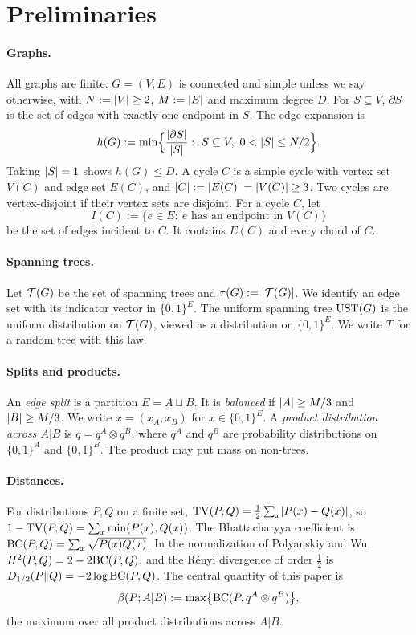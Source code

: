 \section{Preliminaries}\label{sec:prelim}

\paragraph{Graphs.} All graphs are finite. $G=(V,E)$ is connected and simple unless we say otherwise, with $N:=\lvert V\rvert\ge2$, $M:=\lvert E\rvert$ and maximum degree $D$. For $S\subseteq V$, $\partial S$ is the set of edges with exactly one endpoint in $S$. The edge expansion is
\[
  h(G):=\min\Bigl\{\frac{\lvert \partial S\rvert}{\lvert S\rvert}:\ S\subseteq V,\ 0<\lvert S\rvert\le N/2\Bigr\}.
\]
Taking $\lvert S\rvert=1$ shows $h(G)\le D$. A cycle $C$ is a simple cycle with vertex set $V(C)$ and edge set $E(C)$, and $\lvert C\rvert:=\lvert E(C)\rvert=\lvert V(C)\rvert\ge3$. Two cycles are vertex-disjoint if their vertex sets are disjoint. For a cycle $C$, let
\[
  I(C):=\{e\in E:\ e\text{ has an endpoint in }V(C)\}
\]
be the set of edges incident to $C$. It contains $E(C)$ and every chord of $C$.

\paragraph{Spanning trees.} Let $\mathcal{T}(G)$ be the set of spanning trees and $\tau(G):=\lvert \mathcal{T}(G)\rvert$. We identify an edge set with its indicator vector in $\{0,1\}^E$. The uniform spanning tree $\mathrm{UST}(G)$ is the uniform distribution on $\mathcal{T}(G)$, viewed as a distribution on $\{0,1\}^E$. We write $T$ for a random tree with this law.

\paragraph{Splits and products.} An \emph{edge split} is a partition $E=A\sqcup B$. It is \emph{balanced} if $\lvert A\rvert\ge M/3$ and $\lvert B\rvert\ge M/3$. We write $x=(x_A,x_B)$ for $x\in\{0,1\}^E$. A \emph{product distribution across $A|B$} is $q=q^A\otimes q^B$, where $q^A$ and $q^B$ are probability distributions on $\{0,1\}^A$ and $\{0,1\}^B$. The product may put mass on non-trees.

\paragraph{Distances.} For distributions $P,Q$ on a finite set, $\mathrm{TV}(P,Q)=\frac12\sum_x\lvert P(x)-Q(x)\rvert$, so $1-\mathrm{TV}(P,Q)=\sum_x\min(P(x),Q(x))$. The Bhattacharyya coefficient is $\mathrm{BC}(P,Q)=\sum_x\sqrt{P(x)Q(x)}$. In the normalization of Polyanskiy and Wu, $H^2(P,Q)=2-2\mathrm{BC}(P,Q)$, and the R\'enyi divergence of order $\frac12$ is $D_{1/2}(P\|Q)=-2\log\mathrm{BC}(P,Q)$. The central quantity of this paper is
\[
  \beta(P;A|B):=\max\bigl\{\mathrm{BC}(P,q^A\otimes q^B)\bigr\},
\]
the maximum over all product distributions across $A|B$.

